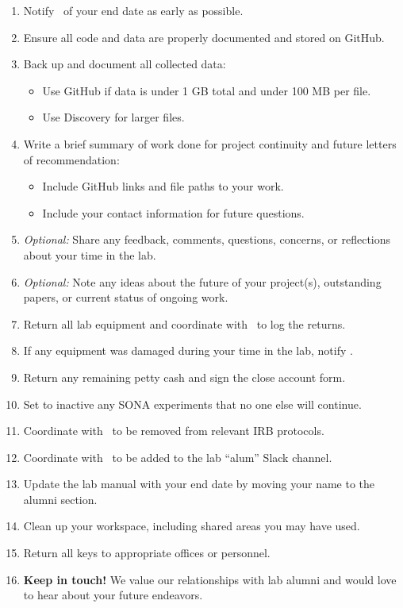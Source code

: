 \documentclass{tufte-book} %
\begin{document}
\begin{enumerate}
\item Notify \director~of your end date as early as possible.

\item Ensure all code and data are properly documented and stored on GitHub.

\item Back up and document all collected data:
  \begin{itemize}
  \item Use GitHub if data is under 1 GB total and under 100 MB per file.
  \item Use Discovery for larger files.
  \end{itemize}

\item Write a brief summary of work done for project continuity and future letters of recommendation:
  \begin{itemize}
  \item Include GitHub links and file paths to your work.
  \item Include your contact information for future questions.
  \end{itemize}

\item \textit{Optional:} Share any feedback, comments, questions, concerns, or reflections about your time in the lab.

\item \textit{Optional:} Note any ideas about the future of your project(s), outstanding papers, or current status of ongoing work.

\item Return all lab equipment and coordinate with \director~to log the returns.

\item If any equipment was damaged during your time in the lab, notify \director.

\item Return any remaining petty cash and sign the close account form.

\item Set to inactive any SONA experiments that no one else will continue.

\item Coordinate with \director~to be removed from relevant IRB protocols.

\item Coordinate with \director~to be added to the lab ``alum'' Slack channel.

\item Update the lab manual with your end date by moving your name to the alumni section.

\item Clean up your workspace, including shared areas you may have used.

\item Return all keys to appropriate offices or personnel.

\item \textbf{Keep in touch!} We value our relationships with lab alumni and would love to hear about your future endeavors.
\end{enumerate}
\end{document}
